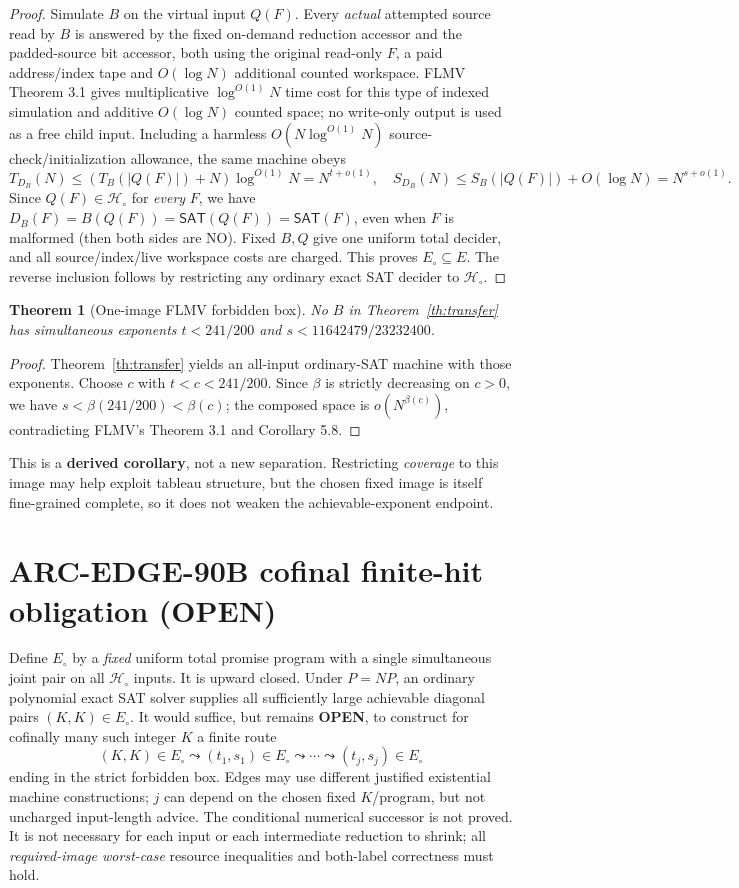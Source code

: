 \documentclass[11pt]{article}
\newtheorem{theorem}{Theorem}
\newcommand{\SAT}{\mathsf{SAT}}
\begin{document}
\begin{proof}
Simulate \(B\) on the virtual input \(Q(F)\). Every \emph{actual} attempted source read by \(B\) is answered by the fixed on-demand reduction accessor and the padded-source bit accessor, both using the original read-only \(F\), a paid address/index tape and \(O(\log N)\) additional counted workspace. FLMV Theorem 3.1 gives multiplicative \(\log^{O(1)}N\) time cost for this type of indexed simulation and additive \(O(\log N)\) counted space; no write-only output is used as a free child input. Including a harmless \(O(N\log^{O(1)}N)\) source-check/initialization allowance, the same machine obeys
\[
T_{D_B}(N)\le (T_B(|Q(F)|)+N)\log^{O(1)}N=N^{t+o(1)},\quad
S_{D_B}(N)\le S_B(|Q(F)|)+O(\log N)=N^{s+o(1)}.
\]
Since \(Q(F)\in\mathcal H_\circ\) for \emph{every} \(F\), we have \(D_B(F)=B(Q(F))=\SAT(Q(F))=\SAT(F)\), even when \(F\) is malformed (then both sides are NO). Fixed \(B,Q\) give one uniform total decider, and all source/index/live workspace costs are charged. This proves \(E_\circ\subseteq E\). The reverse inclusion follows by restricting any ordinary exact SAT decider to \(\mathcal H_\circ\).
\end{proof}
\begin{theorem}[One-image FLMV forbidden box]\label{th:box}
No \(B\) in Theorem~\ref{th:transfer} has simultaneous exponents \(t<241/200\) and \(s<11642479/23232400\).
\end{theorem}
\begin{proof}
Theorem~\ref{th:transfer} yields an all-input ordinary-SAT machine with those exponents. Choose \(c\) with \(t<c<241/200\). Since \(\beta\) is strictly decreasing on \(c>0\), we have \(s<\beta(241/200)<\beta(c)\); the composed space is \(o(N^{\beta(c)})\), contradicting FLMV's Theorem 3.1 and Corollary 5.8.
\end{proof}
This is a \textbf{derived corollary}, not a new separation. Restricting \emph{coverage} to this image may help exploit tableau structure, but the chosen fixed image is itself fine-grained complete, so it does not weaken the achievable-exponent endpoint.
\section{ARC-EDGE-90B cofinal finite-hit obligation (OPEN)}
Define \(E_\circ\) by a \emph{fixed} uniform total promise program with a single simultaneous joint pair on all \(\mathcal H_\circ\) inputs. It is upward closed. Under \(P=NP\), an ordinary polynomial exact SAT solver supplies all sufficiently large achievable diagonal pairs \((K,K)\in E_\circ\). It would suffice, but remains \textbf{OPEN}, to construct for cofinally many such integer \(K\) a finite route
\[
(K,K)\in E_\circ\leadsto(t_1,s_1)\in E_\circ
\leadsto\cdots\leadsto(t_j,s_j)\in E_\circ
\]
ending in the strict forbidden box. Edges may use different justified existential machine constructions; \(j\) can depend on the chosen fixed \(K\)/program, but not uncharged input-length advice. The conditional numerical successor is not proved. It is not necessary for each input or each intermediate reduction to shrink; all \emph{required-image worst-case} resource inequalities and both-label correctness must hold.
\end{document}

